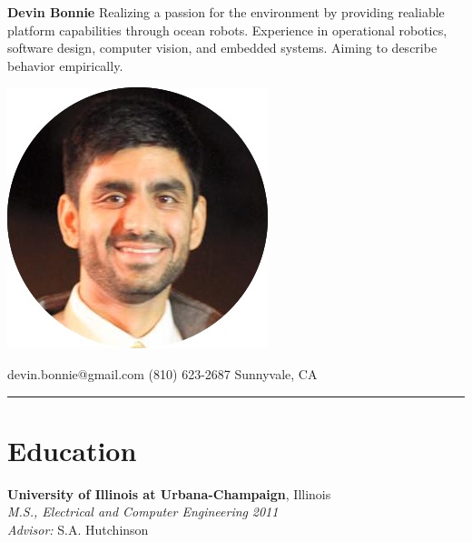 \documentclass[article]{resume}
\begin{document}
%
\begin{minipage}[t]{0.33\textwidth}
\begin{flushleft}
 \textbf{\large{Devin Bonnie}}
\linebreak
\linebreak
\small{Realizing a passion for the environment by providing realiable platform capabilities through ocean robots. Experience in operational robotics, software design, computer vision, and embedded systems. Aiming to describe behavior empirically.\\}
\vspace*{1\baselineskip}
\end{flushleft}
\end{minipage}	
\begin{minipage}[c]{0.33\textwidth}
\begin{center}
\includegraphics[trim= 0cm 10cm 0 0cm,scale=0.22]{dbCircle}
\end{center}
\end{minipage}
\begin{minipage}[t]{0.33\textwidth}
\begin{flushright}
\vspace*{1\baselineskip}
devin.bonnie@gmail.com
\linebreak
\linebreak
(810) 623-2687
\linebreak
\linebreak
Sunnyvale, CA 
\end{flushright}
\end{minipage}
%
\noindent\rule{\textwidth}{1pt}
%
%
\section{Education}
\vspace*{0.5\baselineskip}
\textbf{University of Illinois at Urbana-Champaign}, Illinois\\
\textsl{M.S., Electrical and Computer Engineering} \hfill \textsl{2011}\\
\textsl{Advisor:} S.A. Hutchinson\vspace{-0.5mm}
\end{document}
